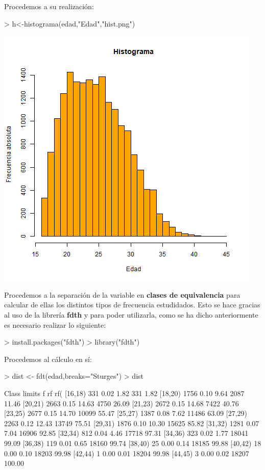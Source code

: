 \documentclass [a4paper] {article}
\begin{document}
Procedemos a su realizaci\'on:
\begin{Schunk}
\begin{Sinput}
> h<-histograma(edad,"Edad","hist.png")
\end{Sinput}
\end{Schunk}
\includegraphics[width=\textwidth]{hist}


\bigskip
Procedemos a la separaci\'on de la variable en \textbf{clases de equivalencia} para calcular de ellas los distintos tipos de
frecuencia estudidados. Esto se hace gracias al uso de la librer\'ia \textbf{fdth} y para poder utilizarla, como se ha dicho 
anteriormente es necesario realizar lo siguiente:
\begin{Schunk}
\begin{Sinput}
> install.packages("fdth")
> library("fdth")
\end{Sinput}
\end{Schunk}

Procedemos al c\'alculo en s\'i:
\begin{Schunk}
\begin{Sinput}
> dist <- fdt(edad,breaks="Sturges")
> dist
\end{Sinput}
\begin{Soutput}
 Class limits    f   rf rf(%
      [16,18)  331 0.02  1.82   331   1.82
      [18,20) 1756 0.10  9.64  2087  11.46
      [20,21) 2663 0.15 14.63  4750  26.09
      [21,23) 2672 0.15 14.68  7422  40.76
      [23,25) 2677 0.15 14.70 10099  55.47
      [25,27) 1387 0.08  7.62 11486  63.09
      [27,29) 2263 0.12 12.43 13749  75.51
      [29,31) 1876 0.10 10.30 15625  85.82
      [31,32) 1281 0.07  7.04 16906  92.85
      [32,34)  812 0.04  4.46 17718  97.31
      [34,36)  323 0.02  1.77 18041  99.09
      [36,38)  119 0.01  0.65 18160  99.74
      [38,40)   25 0.00  0.14 18185  99.88
      [40,42)   18 0.00  0.10 18203  99.98
      [42,44)    1 0.00  0.01 18204  99.98
      [44,45)    3 0.00  0.02 18207 100.00
\end{Soutput}
\end{Schunk}
\end{document}
